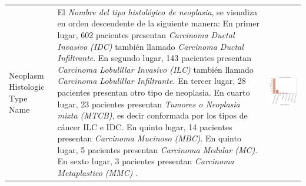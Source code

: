 \begin{table}[!htb]
	\footnotesize
	\begin{threeparttable}
		\begin{tabular}{p{2.5cm} p{7cm} p{6.5cm}} \toprule
			
			Neoplasm Histologic Type Name
			& El \textit{Nombre del tipo histológico de neoplasia}, se visualiza en orden descendente de la siguiente manera: En primer lugar, 602 pacientes presentan \textit{Carcinoma Ductal Invasivo (IDC)} también llamado \textit{Carcinoma Ductal Infiltrante}. En segundo lugar, 143 pacientes presentan \textit{Carcinoma Lobulillar Invasivo (ILC)} también llamado \textit{Carcinoma Lobulillar Infiltrante.} En tercer lugar, 28 pacientes presentan otro tipo de neoplasia. En cuarto lugar, 23 pacientes presentan \textit{Tumores o Neoplasia mixta (MTCB)}, es decir conformada por los tipos de cáncer ILC e IDC. En quinto lugar, 14 pacientes presentan \textit{Carcinoma Mucinoso (MBC)}. En quinto lugar, 5 pacientes presentan \textit{Carcinoma Medular (MC)}. En sexto lugar, 3 pacientes presentan \textit{Carcinoma Metaplastico (MMC)}
			.
			& \begin{center}\includegraphics[width=1\linewidth]{NOTEBOOK/IMAGENES_DESCRIPTIVAS/18_neoplasm_histologic_type}\end{center}

\end{tabular}
\end{threeparttable}
\end{table}
